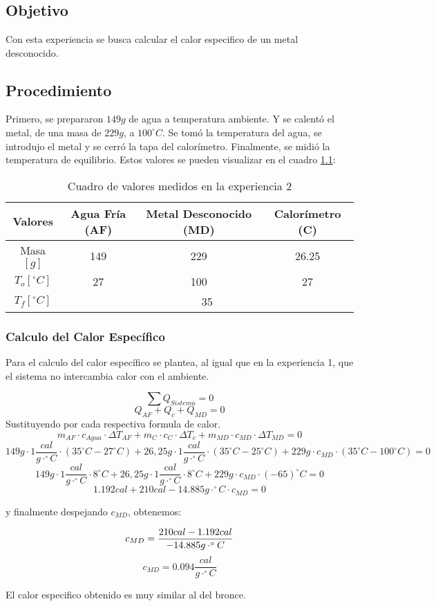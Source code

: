 \documentclass[12pt]{report}
\begin{document}
\chapter{}
\section{Objetivo}
Con esta experiencia se busca calcular el calor especifico de un metal desconocido.

\section{Procedimiento}
Primero, se prepararon $149 g$ de agua a temperatura ambiente. Y se calentó el metal, de una masa de $229 g$, a $100^\circ C$. Se tomó la temperatura del agua, se introdujo el metal y se cerró la tapa del calorímetro. Finalmente, se midió la temperatura de equilibrio.
Estos valores se pueden visualizar en el cuadro \ref{table:data}:

\begin{table}[htbp]
\centering
\begin{tabular}{|c|c|c|c|}
    \hline
    Valores & Agua Fría (AF) & Metal Desconocido (MD)  & Calorímetro (C)\\
    \hline
    Masa$[g]$ & 149 & 229 & 26.25 \\
    \hline
    $T_o [^\circ C]$ & 27 & 100 & 27 \\
    \hline
    $T_f [^\circ C]$ & \multicolumn{3}{|c|}{35}\\
    \hline
\end{tabular}
\caption{Cuadro de valores medidos en la experiencia 2}
\label{table:data}
\end{table}

\subsection{Calculo del Calor Específico}

Para el calculo del calor específico se plantea, al igual que en la experiencia 1, que el sistema no intercambia calor con el ambiente.

$$\sum Q_{Sistema} = 0$$
$$Q_{AF} + Q_c + Q_{MD} = 0$$
\hspace{1cm} Sustituyendo por cada respectiva formula de calor.
$$m_{AF} \cdot c_{Agua} \cdot {\Delta T}_{AF} + m_C \cdot c_C \cdot {\Delta T}_c + m_{MD} \cdot c_{MD} \cdot {\Delta T}_{MD} = 0$$
$$149g \cdot 1 \frac{cal}{g\cdot^\circ C} \cdot (35^\circ C - 27^\circ C) + 26,25g \cdot 1 \frac{cal}{g\cdot^\circ C} \cdot (35^\circ C - 25^\circ C) + 229g \cdot  c_{MD} \cdot (35^\circ C - 100^\circ C) = 0$$
$$149g \cdot 1 \frac{cal}{g\cdot^\circ C} \cdot 8^\circ C + 26,25g \cdot 1 \frac{cal}{g\cdot^\circ C} \cdot 8^\circ C + 229g \cdot c_{MD}  \cdot (-65)^\circ C = 0$$
$$1.192 cal + 210 cal - 14.885 g\cdot^\circ C \cdot c_{MD}  = 0$$

\hspace{1cm} y finalmente despejando $c_{MD}$, obtenemos:

$$c_{MD}  = \frac{210 cal - 1.192 cal}{-14.885 g\cdot^\circ C}\\$$
$$c_{MD}  = 0.094 \frac{cal}{g\cdot^\circ C}$$

El calor especifico obtenido es muy similar al del bronce.
\end{document}

